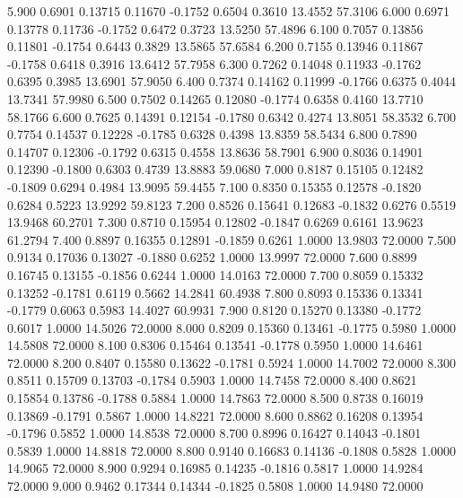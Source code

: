    5.900   0.6901   0.13715   0.11670  -0.1752   0.6504   0.3610  13.4552  57.3106
   6.000   0.6971   0.13778   0.11736  -0.1752   0.6472   0.3723  13.5250  57.4896
   6.100   0.7057   0.13856   0.11801  -0.1754   0.6443   0.3829  13.5865  57.6584
   6.200   0.7155   0.13946   0.11867  -0.1758   0.6418   0.3916  13.6412  57.7958
   6.300   0.7262   0.14048   0.11933  -0.1762   0.6395   0.3985  13.6901  57.9050
   6.400   0.7374   0.14162   0.11999  -0.1766   0.6375   0.4044  13.7341  57.9980
   6.500   0.7502   0.14265   0.12080  -0.1774   0.6358   0.4160  13.7710  58.1766
   6.600   0.7625   0.14391   0.12154  -0.1780   0.6342   0.4274  13.8051  58.3532
   6.700   0.7754   0.14537   0.12228  -0.1785   0.6328   0.4398  13.8359  58.5434
   6.800   0.7890   0.14707   0.12306  -0.1792   0.6315   0.4558  13.8636  58.7901
   6.900   0.8036   0.14901   0.12390  -0.1800   0.6303   0.4739  13.8883  59.0680
   7.000   0.8187   0.15105   0.12482  -0.1809   0.6294   0.4984  13.9095  59.4455
   7.100   0.8350   0.15355   0.12578  -0.1820   0.6284   0.5223  13.9292  59.8123
   7.200   0.8526   0.15641   0.12683  -0.1832   0.6276   0.5519  13.9468  60.2701
   7.300   0.8710   0.15954   0.12802  -0.1847   0.6269   0.6161  13.9623  61.2794
   7.400   0.8897   0.16355   0.12891  -0.1859   0.6261   1.0000  13.9803  72.0000
   7.500   0.9134   0.17036   0.13027  -0.1880   0.6252   1.0000  13.9997  72.0000
   7.600   0.8899   0.16745   0.13155  -0.1856   0.6244   1.0000  14.0163  72.0000
   7.700   0.8059   0.15332   0.13252  -0.1781   0.6119   0.5662  14.2841  60.4938
   7.800   0.8093   0.15336   0.13341  -0.1779   0.6063   0.5983  14.4027  60.9931
   7.900   0.8120   0.15270   0.13380  -0.1772   0.6017   1.0000  14.5026  72.0000
   8.000   0.8209   0.15360   0.13461  -0.1775   0.5980   1.0000  14.5808  72.0000
   8.100   0.8306   0.15464   0.13541  -0.1778   0.5950   1.0000  14.6461  72.0000
   8.200   0.8407   0.15580   0.13622  -0.1781   0.5924   1.0000  14.7002  72.0000
   8.300   0.8511   0.15709   0.13703  -0.1784   0.5903   1.0000  14.7458  72.0000
   8.400   0.8621   0.15854   0.13786  -0.1788   0.5884   1.0000  14.7863  72.0000
   8.500   0.8738   0.16019   0.13869  -0.1791   0.5867   1.0000  14.8221  72.0000
   8.600   0.8862   0.16208   0.13954  -0.1796   0.5852   1.0000  14.8538  72.0000
   8.700   0.8996   0.16427   0.14043  -0.1801   0.5839   1.0000  14.8818  72.0000
   8.800   0.9140   0.16683   0.14136  -0.1808   0.5828   1.0000  14.9065  72.0000
   8.900   0.9294   0.16985   0.14235  -0.1816   0.5817   1.0000  14.9284  72.0000
   9.000   0.9462   0.17344   0.14344  -0.1825   0.5808   1.0000  14.9480  72.0000
